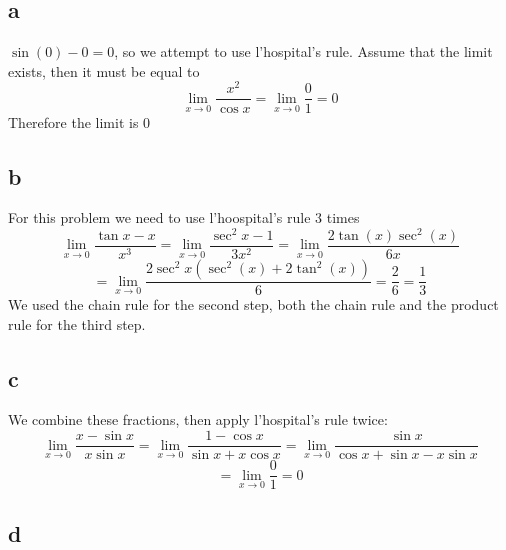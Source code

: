 \documentclass[12pt]{article}
\begin{document}
\subsection{a}
$\sin(0)-0=0$, so we attempt to use l'hospital's rule. Assume that the limit exists, then it must be equal to
$$\lim_{x \to 0}\frac{x^2}{\cos x} = \lim_{x \to 0}\frac{0}{1} = 0$$
Therefore the limit is 0

\subsection{b}
For this problem we need to use l'hoospital's rule 3 times
$$\lim_{x \to 0} \frac{\tan x-x}{x^3} = \lim_{x \to 0} \frac{\sec^2 x-1}{3x^2} = \lim_{x \to 0}\frac{2\tan(x)\sec^2(x)}{6x}$$
$$= \lim_{x \to 0}\frac{2 \sec^2x (\sec^2(x) + 2 \tan^2(x))}{6} = \frac{2}{6} = \frac{1}{3}$$
We used the chain rule for the second step, both the chain rule and the product rule for the third step.

\subsection{c}
We combine these fractions, then apply l'hospital's rule twice:
$$\lim_{x\to 0}\frac{x-\sin x}{x\sin x} = \lim_{x\to 0}\frac{1-\cos x}{\sin x + x\cos x} = \lim_{x\to 0}\frac{\sin x}{\cos x + \sin x - x \sin x} $$
$$= \lim_{x\to 0}\frac{0}{1} = 0$$

\subsection{d}
\end{document}
